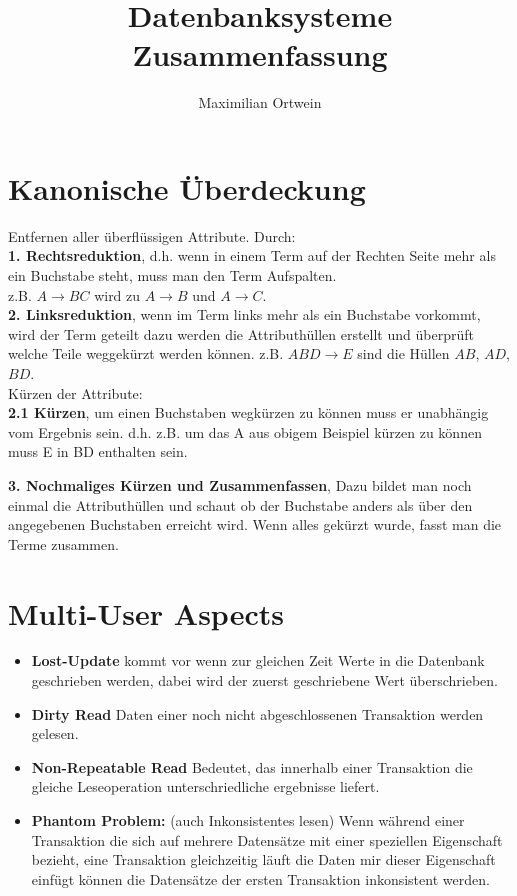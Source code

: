 \documentclass[a4paper]{scrartcl}
\begin{document}
\author{Maximilian Ortwein}
\title{Datenbanksysteme Zusammenfassung}
\fancyfoot[C]{\thepage}
\renewcommand{\footrulewidth}{0.5pt}
\renewcommand{\headrulewidth}{0.5pt}
{\theoremsymbol{$\square$}\newtheorem{Beweis}{Beweis}}
\maketitle

\section{Kanonische Überdeckung}
Entfernen aller überflüssigen Attribute. Durch:\\
\textbf{1. Rechtsreduktion}, d.h. wenn in einem Term auf der Rechten Seite mehr als ein Buchstabe
steht, muss man den Term Aufspalten.\\
z.B. $A\to BC$ wird zu $A \to B$ und $A \to C$.\\

\textbf{2. Linksreduktion}, wenn im Term links mehr als ein Buchstabe vorkommt, wird der Term geteilt dazu werden die Attributhüllen erstellt und überprüft welche Teile weggekürzt werden können. z.B. $ABD \to E $ sind die Hüllen $AB$, $AD$, $BD$.\\
Kürzen der Attribute:\\
\textbf{2.1 Kürzen}, um einen Buchstaben wegkürzen zu können muss er unabhängig vom Ergebnis sein. d.h. z.B. um das A aus obigem Beispiel kürzen zu können muss E in BD enthalten sein.

\textbf{3. Nochmaliges Kürzen und Zusammenfassen}, Dazu bildet man noch einmal die Attributhüllen und schaut ob der Buchstabe anders als über den angegebenen Buchstaben erreicht wird. Wenn alles gekürzt wurde, fasst man die Terme zusammen.

\section{Multi-User Aspects}
\begin{itemize}
\item \textbf{Lost-Update} kommt vor wenn zur gleichen Zeit Werte in die Datenbank geschrieben 
werden, dabei wird der zuerst geschriebene Wert überschrieben.
\item  \textbf{Dirty Read} Daten einer noch nicht abgeschlossenen Transaktion werden gelesen.
\item \textbf{Non-Repeatable Read} Bedeutet, das innerhalb einer Transaktion die gleiche Leseoperation unterschriedliche ergebnisse liefert.
\item \textbf{Phantom Problem:} (auch Inkonsistentes lesen) Wenn während einer Transaktion die sich auf mehrere Datensätze mit einer speziellen Eigenschaft bezieht, eine Transaktion gleichzeitig läuft die Daten mir dieser Eigenschaft einfügt können die Datensätze der ersten Transaktion inkonsistent werden.

\end{itemize}  
\end{document}
